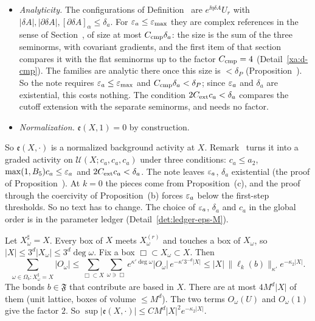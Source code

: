\begin{detail}
\begin{step}
\begin{itemize}
\item \emph{Analyticity.} The configurations of Definition~ are $e^{\ii\eta\delta\!A}U_r$ with $|\delta\!A|,|\partial\delta\!A|,[\partial\delta\!A]_\alpha\le\delta_a$. For $\varepsilon_a\le\varepsilon_{\max}$ they are complex references in the sense of Section~, of size at most $C_{\rm cmp}\delta_a$: the size is the sum of the three seminorms, with covariant gradients, and the first item of that section compares it with the flat seminorms up to the factor $C_{\rm cmp}=4$ (Detail~\ref{xa:d-cmp}). The families are analytic there once this size is $<\delta_P$ (Proposition~). So the note requires $\varepsilon_a\le\varepsilon_{\max}$ and $C_{\rm cmp}\delta_a<\delta_P$; since $\varepsilon_a$ and $\delta_a$ are existential, this costs nothing. The condition $2C_{\rm ext}c_a<\delta_a$ compares the cutoff extension with the separate seminorms, and needs no factor.
\item \emph{Normalization.} $\mathfrak e(X,1)=0$ by construction.
\end{itemize}
So $\mathfrak e(X,\cdot)$ is a normalized background activity at $X$. Remark~ turns it into a graded activity on $\mathcal U(X;c_a,c_a,c_a)$ under three conditions: $c_a\le a_2$, $\max(1,B_5)c_a\le\varepsilon_a$ and $2C_{\rm ext}c_a<\delta_a$. The note leaves $\varepsilon_a$, $\delta_a$ existential (the proof of Proposition~). At $k=0$ the pieces come from Proposition~(c), and the proof through the coercivity of Proposition~(b) forces $\varepsilon_a$ below the first-step thresholds. So no text has to change. The choice of $\varepsilon_a$, $\delta_a$ and $c_a$ in the global order is in the parameter ledger (Detail~\ref{det:ledger-eps-M}).
\end{step}
\begin{step}
Let $X^\sharp_\omega=X$. Every box of $X$ meets $X^{(r)}_\omega$ and touches a box of $X_\omega$, so $|X|\le3^d|X_\omega|\le3^d\deg\omega$. Fix a box $\Box\subset X_\omega\subset X$. Then
\[
\sum_{\omega\in\Omega_b:X^\sharp_\omega=X}|O_\omega|\le\sum_{\Box\subset X}\sum_{\omega\ni\Box}e^{\kappa'\deg\omega}|O_\omega|\,e^{-\kappa'3^{-d}|X|}\le|X|\,\|\ell_k(b)\|_{\kappa'}e^{-\kappa_2|X|} .
\]
The bonds $b\in\mathfrak F$ that contribute are based in $X$. There are at most $4M^d|X|$ of them (unit lattice, boxes of volume $\le M^d$). The two terms $O_\omega(U)$ and $O_\omega(1)$ give the factor $2$. So $\sup|\mathfrak e(X,\cdot)|\le CM^d|X|^2e^{-\kappa_2|X|}$.

\end{step}
\end{detail}
